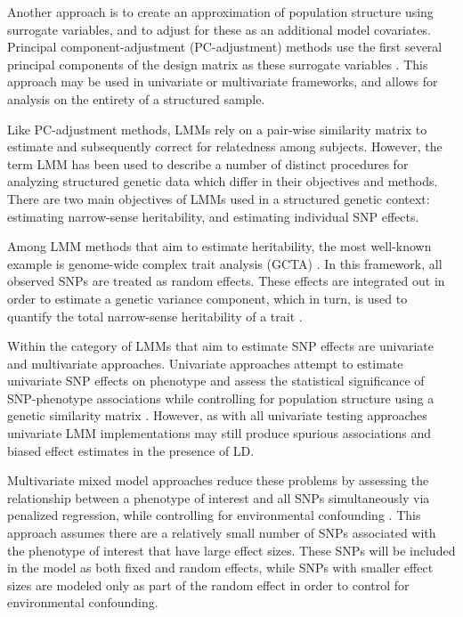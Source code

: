 Another approach is to create an approximation of population structure using surrogate variables, and to adjust for these as an additional model covariates. Principal component-adjustment (PC-adjustment) methods use the first several principal components of the design matrix as these surrogate variables \cite{price2006principal}. This approach may be used in univariate or multivariate frameworks, and allows for analysis on the entirety of a structured sample. 

Like PC-adjustment methods, LMMs rely on a pair-wise similarity matrix to estimate and subsequently correct for relatedness among subjects. However, the term LMM has been used to describe a number of distinct procedures for analyzing structured genetic data which differ in their objectives and methods. There are two main objectives of LMMs used in a structured genetic context: estimating narrow-sense heritability, and estimating individual SNP effects.

Among LMM methods that aim to estimate heritability, the most well-known example is genome-wide complex trait analysis (GCTA) \cite{yang2011gcta}. In this framework, all observed SNPs are treated as random effects. These effects are integrated out in order to estimate a genetic variance component, which in turn, is used to quantify the total narrow-sense heritability of a trait \cite{yang2010common}. 

Within the category of LMMs that aim to estimate SNP effects are univariate and multivariate approaches. Univariate approaches attempt to estimate univariate SNP effects on phenotype and assess the statistical significance of SNP-phenotype associations while controlling for population structure using a genetic similarity matrix \cite{yu2006unified, kang2010variance, kang2008efficient}. However, as with all univariate testing approaches univariate LMM implementations may still produce spurious associations and biased effect estimates in the presence of LD. 

Multivariate mixed model approaches reduce these problems by assessing the relationship between a phenotype of interest and all SNPs simultaneously via penalized regression, while controlling for environmental confounding  \cite{Rakitsch2012, bhatnagar2019simultaneous}. This approach assumes there are a relatively small number of SNPs associated with the phenotype of interest that have large effect sizes. These SNPs will be included in the model as both fixed and random effects, while SNPs with smaller effect sizes are modeled only as part of the random effect in order to control for environmental confounding. \\

